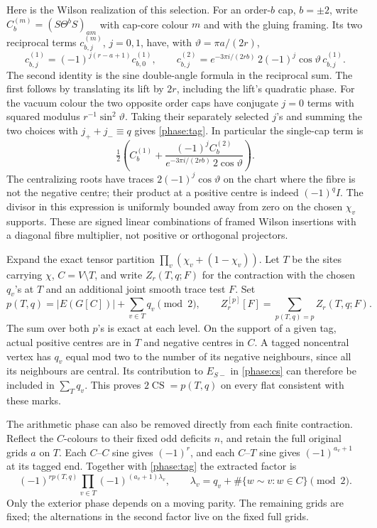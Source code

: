 Here is the Wilson realization of this selection. For an order-\(b\) cap, \(b=\pm2\), write \(C_{b}^{(m)}=(S\Theta^bS)_{a m}\) with cap-core colour \(m\) and with the gluing framing. Its two reciprocal terms \(c^{(m)}_{b,j}\), \(j=0,1\), have, with \(\vartheta=\pi a/(2r)\),
\[
 c^{(1)}_{b,j}=(-1)^{j(r-a+1)}c^{(1)}_{b,0},\qquad
 c^{(2)}_{b,j}=e^{-3\pi i/(2rb)}\,2(-1)^j\cos\vartheta\,c^{(1)}_{b,j}.
\]
The second identity is the sine double-angle formula in the reciprocal sum. The first follows by translating its lift by \(2r\), including the lift's quadratic phase. For the vacuum colour the two opposite order caps have conjugate \(j=0\) terms with squared modulus \(r^{-1}\sin^2\vartheta\). Taking their separately selected \(j\)'s and summing the two choices with \(j_++j_-\equiv q\) gives \eqref{phase:tag}. In particular the single-cap term is
\[
 \tfrac12\left(C_b^{(1)}+
      \frac{(-1)^j C_b^{(2)}}{e^{-3\pi i/(2rb)}\,2\cos\vartheta}\right).
\]
The centralizing roots have traces \(2(-1)^j\cos\vartheta\) on the chart where the fibre is not the negative centre; their product at a positive centre is indeed \((-1)^q I\). The divisor in this expression is uniformly bounded away from zero on the chosen \(\chi_v\) supports. These are signed linear combinations of framed Wilson insertions with a diagonal fibre multiplier, not positive or orthogonal projectors.

Expand the exact tensor partition \(\prod_v(\chi_v+(1-\chi_v))\). Let \(T\) be the sites carrying \(\chi\), \(C=V\setminus T\), and write \(Z_r(T,q;F)\) for the contraction with the chosen \(q_v\)'s at \(T\) and an additional joint smooth trace test \(F\). Set
\begin{equation}
 p(T,q)=|E(G[C])|+\sum_{v\in T}q_v\pmod2,\qquad
 Z_r^{[p]}[F]=\sum_{p(T,q)=p}Z_r(T,q;F).
 \label{phase:split}
\end{equation}
The sum over both \(p\)'s is exact at each level. On the support of a given tag, actual positive centres are in \(T\) and negative centres in \(C\). A tagged noncentral vertex has \(q_v\) equal mod two to the number of its negative neighbours, since all its neighbours are central. Its contribution to \(E_{S-}\) in \eqref{phase:cs} can therefore be included in \(\sum_T q_v\). This proves \(2\operatorname{CS}=p(T,q)\) on every flat consistent with these marks.

The arithmetic phase can also be removed directly from each finite contraction. Reflect the \(C\)-colours to their fixed odd deficits \(n\), and retain the full original grids \(a\) on \(T\). Each \(C\)--\(C\) sine gives \((-1)^r\), and each \(C\)--\(T\) sine gives \((-1)^{a_v+1}\) at its tagged end. Together with \eqref{phase:tag} the extracted factor is
\begin{equation}
 (-1)^{rp(T,q)}\prod_{v\in T}(-1)^{(a_v+1)\lambda_v},
 \qquad
 \lambda_v=q_v+\#\{w\sim v:w\in C\}\pmod2.
 \label{phase:sign}
\end{equation}
Only the exterior phase depends on a moving parity. The remaining grids are fixed; the alternations in the second factor live on the fixed full grids.

